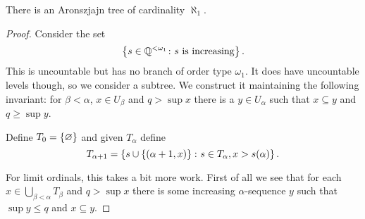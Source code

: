 \begin{proposition}
    There is an Aronszjajn tree of cardinality \(\aleph_{1}\).

    \begin{proof}
        Consider the set
        \[
            \left\{s\in\mathbb{Q}^{<\omega_{1}}\colon\textnormal{\(s\) is increasing}\right\}.
        \]
        This is uncountable but has no branch of order type \(\omega_{1}\). It
        does have uncountable levels though, so we consider a subtree. We
        construct it maintaining the following invariant: for \(\beta<\alpha\),
        \(x\in U_{\beta}\) and \(q>\sup x\) there is a \(y\in U_{\alpha}\) such
        that \(x\subseteq y\) and \(q\geq\sup y\).

        Define \(T_{0}=\left\{\varnothing\right\}\) and given \(T_{\alpha}\) define
        \[
            T_{\alpha+1}=\left\{s\cup\left\{(\alpha+1,x)\right\}\colon s\in T_{\alpha},x>s(\alpha)\right\}.
        \]

        For limit ordinals, this takes a bit more work. First of all we see that
        for each \(x\in\bigcup_{\beta<\alpha}T_{\beta}\) and \(q>\sup x\) there
        is some increasing \(\alpha\)-sequence \(y\) such that \(\sup y\leq q\)
        and \(x\subseteq y\).
    \end{proof}
\end{proposition}